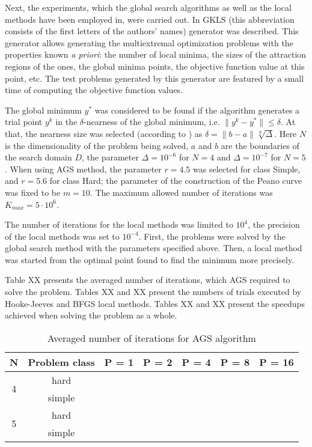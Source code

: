 \documentclass[runningheads]{llncs}
\begin{document}
Next, the experiments, which the global search algorithms as well as the local methods have been employed in, were carried out. In \cite{Gaviano2003} GKLS (this abbreviation consists of the first letters of the authors’ names) generator was described. This generator allows generating the multiextremal optimization problems with the properties known \textit{a priori}: the number of local minima, the sizes of the attraction regions of the ones, the global minima points, the objective function value at this point, etc. The test problems generated by this generator are featured by a small time of computing the objective function values.

The global minimum $y^*$ was considered to be found if the algorithm generates a trial point $y^k$ in the $\delta$-nearness of the global minimum, i.e. $\|y^k -y^*\| \leq \delta$. At that, the nearness size was selected (according to \cite{7}) as $\delta = \| b - a \|\sqrt[N]{\Delta}$. Here $N$ is the dimensionality of the problem being solved, $a$ and $b$ are the boundaries of the search domain $D$, the parameter $\Delta = 10^{-6}$ for $N = 4$ and $\Delta = 10^{-7}$ for $N = 5$. When using AGS method, the parameter $r=4.5$ was selected for class Simple, and $r=5.6$ for class Hard; the parameter of the construction of the Peano curve was fixed to be $m=10$. The maximum allowed number of iterations was $K_{max}= 5\cdot10^6$.

The number of iterations for the local methods was limited to $10^4$, the precision of the local methods was set to $10^{-4}$. First, the problems were solved by the global search method with the parameters specified above. Then, a local method was started from the optimal point found to find the minimum more precisely.

Table XX presents the averaged number of iterations, which AGS required to solve the problem. Tables XX and XX present the numbers of trials executed by Hooke-Jeeves and BFGS local methods. Tables XX and XX present the speedups achieved when solving the problem as a whole.

\begin{table}[ht]
	\caption{Averaged number of iterations for AGS algorithm}
	\label{tab:5}
	\center
	\begin{tabular}{|c|c|c|c|c|c|c|}
		\hline
		N & Problem class & P = 1 & P = 2 & P = 4 & P = 8 & P = 16 \\
		\hline 
		    \multirow{2}{*}{4} & hard &  &  &  &  &  \\ \cline{2-7}
		                       & simple &  &  &  &  &  \\
		\hline
		    \multirow{2}{*}{5} & hard &  &  &  &  &  \\ \cline{2-7}
		                       & simple &  &  &  &  &  \\
		\hline
	\end{tabular}
\end{table}
\end{document}
